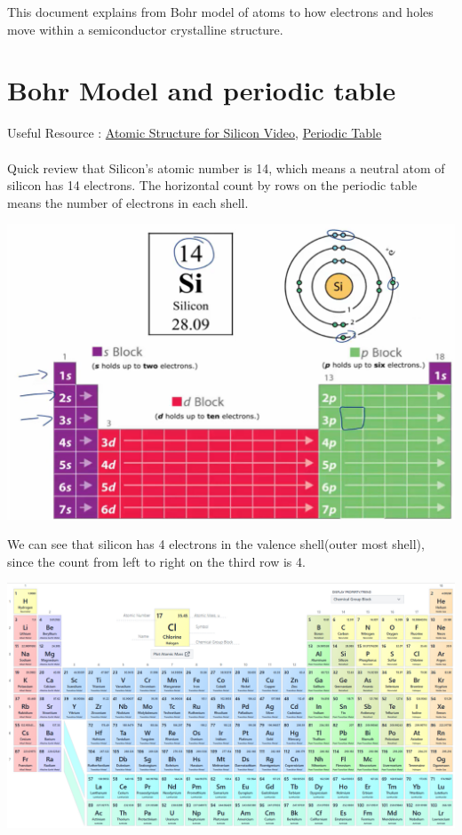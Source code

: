 \documentclass{article}
\begin{document}
	This document explains from Bohr model of atoms to how electrons and holes move within a semiconductor crystalline structure.
	\section{Bohr Model and periodic table}
		Useful Resource : \href{https://www.youtube.com/watch?v=OCTAQaubQ4o&ab_channel=WayneBreslyn%28Dr.B.%29}{Atomic Structure for Silicon Video}, \href{https://pubchem.ncbi.nlm.nih.gov/periodic-table/}{Periodic Table}\\\\
		Quick review that Silicon's atomic number is 14, which means a neutral atom of silicon has 14 electrons. The horizontal count by rows on the periodic table means the number of electrons in each shell.
		\begin{center}
			\includegraphics[width=\textwidth]{img/si_element.png}
		\end{center}
		We can see that silicon has 4 electrons in the valence shell(outer most shell), since the count from left to right on the third row is 4.
		\begin{center}
			\includegraphics[width=\textwidth]{img/periodic_table.png}
		\end{center}
\end{document}
